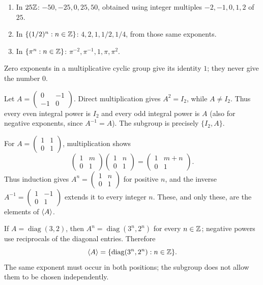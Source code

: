 
\begin{enumerate}[label=(\alph*)]
\item In $25\mathbb{Z}$: $-50,-25,0,25,50$, obtained using integer multiples $-2,-1,0,1,2$ of $25$.
\item In $\{(1/2)^n:n\in\mathbb{Z}\}$: $4,2,1,1/2,1/4$, from those same exponents.
\item In $\{\pi^n:n\in\mathbb{Z}\}$: $\pi^{-2},\pi^{-1},1,\pi,\pi^2$.
\end{enumerate}
Zero exponents in a multiplicative cyclic group give its identity $1$; they never give the number $0$.


Let $A=\begin{pmatrix}0&-1\\-1&0\end{pmatrix}$. Direct multiplication gives $A^2=I_2$, while $A\ne I_2$. Thus every even integral power is $I_2$ and every odd integral power is $A$ (also for negative exponents, since $A^{-1}=A$). The subgroup is precisely $\{I_2,A\}$.


For $A=\begin{pmatrix}1&1\\0&1\end{pmatrix}$, multiplication shows
\[\begin{pmatrix}1&m\\0&1\end{pmatrix}\begin{pmatrix}1&n\\0&1\end{pmatrix}=\begin{pmatrix}1&m+n\\0&1\end{pmatrix}.
\]
Thus induction gives $A^n=\begin{pmatrix}1&n\\0&1\end{pmatrix}$ for positive $n$, and the inverse $A^{-1}=\begin{pmatrix}1&-1\\0&1\end{pmatrix}$ extends it to every integer $n$. These, and only these, are the elements of $\langle A\rangle$.


If $A=\operatorname{diag}(3,2)$, then $A^n=\operatorname{diag}(3^n,2^n)$ for every $n\in\mathbb{Z}$; negative powers use reciprocals of the diagonal entries. Therefore
\[\langle A\rangle=\{\operatorname{diag}(3^n,2^n):n\in\mathbb{Z}\}.
\]
The same exponent must occur in both positions; the subgroup does not allow them to be chosen independently.


